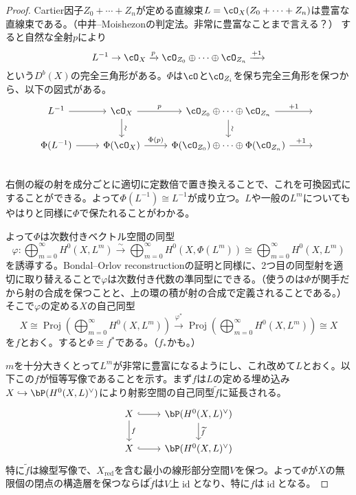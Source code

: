 \documentclass[uplatex, a4paper, dvipdfmx]{jsarticle}
\theoremstyle{definition}
\DeclareMathOperator{\id}{\mathrm{id}}
\DeclareMathOperator{\Proj}{\mathrm{Proj}}
\DeclareMathOperator{\red}{\mathrm{red}}
\begin{document}
\begin{proof}
    Cartier因子$Z_0 + \cdots + Z_n$が定める直線束$L = \cO_X(Z_0 + \cdots + Z_n)$は豊富な直線束である。（中井--Moishezonの判定法。非常に豊富なことまで言える？）
    すると自然な全射$p$により
    \begin{equation}\label{eq:exact-triangle-of-very-ample-line-bundle}
        L^{-1} \to \cO_X \xrightarrow{p} \cO_{Z_0} \oplus \cdots \oplus \cO_{Z_n}\xrightarrow{+1}
    \end{equation}
    という$D^b(X)$の完全三角形がある。$\Phi$は$\cO$と$\cO_{Z_i}$を保ち完全三角形を保つから、以下の図式がある。
    \[
        \begin{tikzcd}
            L^{-1} \ar[r] & \cO_X \ar[r, "p"] \ar[d, "\sim", sloped] & \cO_{Z_0} \oplus \cdots \oplus \cO_{Z_n} \ar[r, "+1"]\ar[d, "\sim", sloped] &{}\\
            \Phi(L^{-1}) \ar[r] & \Phi(\cO_X) \ar[r, "\Phi(p)"] & \Phi(\cO_{Z_0}) \oplus \cdots \oplus \Phi(\cO_{Z_n}) \ar[r, "+1"] &{}\\
        \end{tikzcd}
    \]
    右側の縦の射を成分ごとに適切に定数倍で置き換えることで、これを可換図式にすることができる。よって$\Phi(L^{-1}) \cong L^{-1}$が成り立つ。$L$や一般の$L^m$についてもやはり\cite{MR3182005}と同様に$\Phi$で保たれることがわかる。

    よって$\Phi$は次数付きベクトル空間の同型
    \begin{equation}
        \varphi \colon \bigoplus_{m = 0}^\infty H^0(X, L^m) \xrightarrow{\sim} \bigoplus_{m = 0}^\infty H^0(X, \Phi(L^m)) \cong \bigoplus_{m = 0}^\infty H^0(X, L^m)
    \end{equation}
    を誘導する。Bondal--Orlov reconstructionの証明\cite{MR1818984}と同様に、2つ目の同型射を適切に取り替えることで$\varphi$は次数付き代数の準同型にできる。（使うのは$\Phi$が関手だから射の合成を保つことと、上の環の積が射の合成で定義されることである。）そこで$\varphi$の定める$X$の自己同型
    \begin{equation}
        X \cong \Proj(\bigoplus_{m = 0}^\infty H^0(X, L^m)) \xrightarrow{\varphi^*} \Proj(\bigoplus_{m = 0}^\infty H^0(X, L^m)) \cong X
    \end{equation}
    を$f$とおく。すると$\Phi \cong f^*$である。（$f_*$かも。）

    $m$を十分大きくとって$L^m$が非常に豊富になるようにし、これ改めて$L$とおく。以下この$f$が恒等写像であることを示す。まず$f$は$L$の定める埋め込み$X \hookrightarrow \bP(H^0(X, L)^\vee)$により射影空間の自己同型$\widetilde{f}$に延長される。
    \[
        \begin{tikzcd}
            X \ar[r, hook] \ar[d, "f"] & \bP(H^0(X, L)^\vee) \ar[d, "\widetilde{f}"] \\
            X \ar[r, hook] & \bP(H^0(X, L)^\vee)
        \end{tikzcd}
    \]
    特に$\widetilde{f}$は線型写像で、$X_{\red}$を含む最小の線形部分空間$V$を保つ。よって$\Phi$が$X$の無限個の閉点の構造層を保つならば$\widetilde{f}$は$V$上$\id$となり、特に$f$は$\id$となる。


\end{proof}
\end{document}
